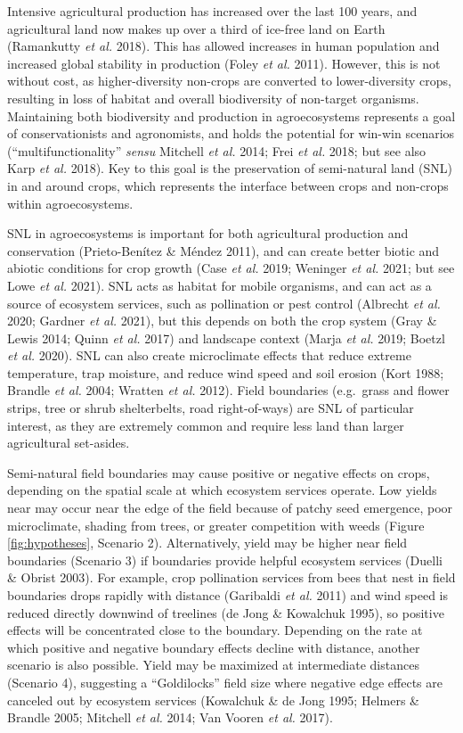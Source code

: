 \documentclass[]{elsarticle} %
\begin{document}
Intensive agricultural production has increased over the last 100 years, and agricultural land now makes up over a third of ice-free land on Earth (Ramankutty \emph{et al.} 2018).
This has allowed increases in human population and increased global stability in production (Foley \emph{et al.} 2011).
However, this is not without cost, as higher-diversity non-crops are converted to lower-diversity crops, resulting in loss of habitat and overall biodiversity of non-target organisms.
Maintaining both biodiversity and production in agroecosystems represents a goal of conservationists and agronomists, and holds the potential for win-win scenarios ({``multifunctionality''} \emph{sensu} Mitchell \emph{et al.} 2014; Frei \emph{et al.} 2018; but see also Karp \emph{et al.} 2018).
Key to this goal is the preservation of semi-natural land (SNL) in and around crops, which represents the interface between crops and non-crops within agroecosystems.

SNL in agroecosystems is important for both agricultural production and conservation (Prieto-Benítez \& Méndez 2011), and can create better biotic and abiotic conditions for crop growth (Case \emph{et al.} 2019; Weninger \emph{et al.} 2021; but see Lowe \emph{et al.} 2021).
SNL acts as habitat for mobile organisms, and can act as a source of ecosystem services, such as pollination or pest control (Albrecht \emph{et al.} 2020; Gardner \emph{et al.} 2021), but this depends on both the crop system (Gray \& Lewis 2014; Quinn \emph{et al.} 2017) and landscape context (Marja \emph{et al.} 2019; Boetzl \emph{et al.} 2020).
SNL can also create microclimate effects that reduce extreme temperature, trap moisture, and reduce wind speed and soil erosion (Kort 1988; Brandle \emph{et al.} 2004; Wratten \emph{et al.} 2012).
Field boundaries (e.g.~grass and flower strips, tree or shrub shelterbelts, road right-of-ways) are SNL of particular interest, as they are extremely common and require less land than larger agricultural set-asides.

Semi-natural field boundaries may cause positive or negative effects on crops, depending on the spatial scale at which ecosystem services operate.
Low yields near may occur near the edge of the field because of patchy seed emergence, poor microclimate, shading from trees, or greater competition with weeds (Figure \ref{fig:hypotheses}, Scenario 2).
Alternatively, yield may be higher near field boundaries (Scenario 3) if boundaries provide helpful ecosystem services (Duelli \& Obrist 2003).
For example, crop pollination services from bees that nest in field boundaries drops rapidly with distance (Garibaldi \emph{et al.} 2011) and wind speed is reduced directly downwind of treelines (de Jong \& Kowalchuk 1995), so positive effects will be concentrated close to the boundary.
Depending on the rate at which positive and negative boundary effects decline with distance, another scenario is also possible.
Yield may be maximized at intermediate distances (Scenario 4), suggesting a ``Goldilocks'' field size where negative edge effects are canceled out by ecosystem services (Kowalchuk \& de Jong 1995; Helmers \& Brandle 2005; Mitchell \emph{et al.} 2014; Van Vooren \emph{et al.} 2017).
\end{document}
